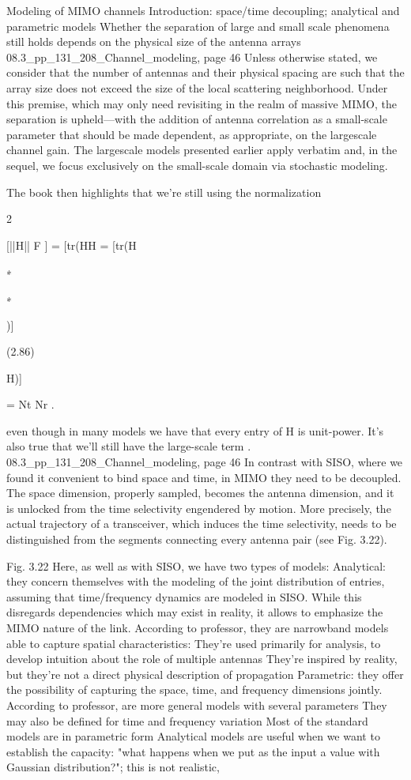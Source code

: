 {{{{Modeling of MIMO channels Introduction: space/time decoupling; analytical and parametric models Whether the separation of large and small scale phenomena still holds depends on the physical size of the antenna arrays 08.3_pp_131_208_Channel_modeling, page 46 Unless otherwise stated, we consider that the number of antennas and their physical spacing are such that the array size does not exceed the size of the local scattering neighborhood. Under this premise, which may only need revisiting in the realm of massive MIMO, the separation is upheld—with the addition of antenna correlation as a small-scale parameter that should be made dependent, as appropriate, on the largescale channel gain. The largescale models presented earlier apply verbatim and, in the sequel, we focus exclusively on the small-scale domain via stochastic modeling.

The book then highlights that we're still using the normalization

2

[||H|| F ] = [tr(HH
= [tr(H

∗

∗

)]

(2.86)

H)]

= Nt Nr .

even though in many models we have that every entry of H is unit-power.
It's also true that we'll still have the large-scale term \sqrtG.
08.3_pp_131_208_Channel_modeling, page 46 In contrast with SISO, where we found it convenient to bind space and time, in MIMO they need to be decoupled. The space dimension, properly sampled, becomes the antenna dimension, and it is unlocked from the time selectivity engendered by motion. More precisely, the actual trajectory of a transceiver, which induces the time selectivity, needs to be distinguished from the segments connecting every antenna pair (see Fig. 3.22).

Fig. 3.22 Here, as well as with SISO, we have two types of models:
Analytical: they concern themselves with the modeling of the joint distribution of entries, assuming that time/frequency dynamics are modeled in SISO.
While this disregards dependencies which may exist in reality, it allows to emphasize the MIMO nature of the link.
According to professor, they are narrowband models able to capture spatial characteristics:
They're used primarily for analysis, to develop intuition about the role of multiple antennas They're inspired by reality, but they're not a direct physical description of propagation Parametric: they offer the possibility of capturing the space, time, and frequency dimensions jointly. According to professor, are more general models with several parameters They may also be defined for time and frequency variation Most of the standard models are in parametric form Analytical models are useful when we want to establish the capacity: "what happens when we put as the input a value with Gaussian distribution?"; this is not realistic,

}}}}
